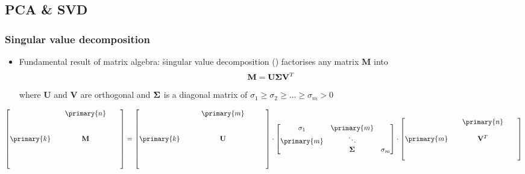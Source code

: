 \documentclass[t]{beamer} %
\begin{document}
\subsection{PCA \& SVD}

\begin{frame}
  \frametitle{Singular value decomposition}

  \ungap[1]
  \begin{itemize}
  \item Fundamental result of matrix algebra: \h{singular value decomposition}
    () factorises any matrix $\mathbf{M}$ into
    \[
    \mathbf{M} = \mathbf{U} \boldsymbol{\Sigma} \mathbf{V}^T
    \]
    where $\mathbf{U}$ and $\mathbf{V}$ are orthogonal and $\boldsymbol{\Sigma}$ is a diagonal matrix of
     $\sigma_1\geq \sigma_2\geq \dots \geq \sigma_m > 0$
  \end{itemize}

  \begin{equation*}
    \begin{bmatrix}
      & & \primary{n} & & \\
      & & & & \\
      & & & & \\
      \primary{k} & & \mathbf{M} & & \\
      & & & & \\
      & & & & \\
      & & & & 
    \end{bmatrix}
    =
    \begin{bmatrix}
      & & & \primary{m} & & & \\
      & & & & & & \\
      & & & & & & \\
      \primary{k} & & & \mathbf{U} & & & \\
      & & & & & & \\
      & & & & & & \\
      & & & & & &
    \end{bmatrix}
    \cdot
    \begin{bmatrix}
      \sigma_1 & \primary{m} & \\
      \primary{m} & \ddots & \\
      & \Msigma & \sigma_m
    \end{bmatrix}
    \cdot
    \begin{bmatrix}
      & & \primary{n} & & \\
      & & & & \\
      \primary{m} & & \mathbf{V}^T & & \\
      & & & & \\
      & & & &
    \end{bmatrix}
  \end{equation*}
\end{frame}
\end{document}
